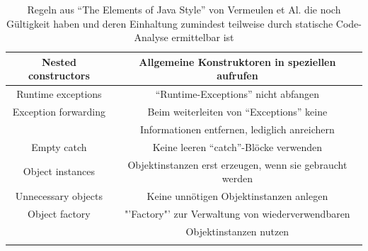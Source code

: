 \documentclass[da,ngerman]{stthesis}
\begin{document}
\begin{center}
\begin{longtabu}{|c|c|}
  						\hline
  						Nested constructors & Allgemeine Konstruktoren in speziellen aufrufen \\
  						\hline
  						Runtime exceptions & "`Runtime-Exceptions"' nicht abfangen \\
  						\hline
  						Exception forwarding & Beim weiterleiten von "`Exceptions"' keine \\ & Informationen entfernen, lediglich anreichern \\
  						\hline   
  						Empty catch & Keine leeren "`catch"'-Blöcke verwenden \\
  						\hline
  						Object instances & Objektinstanzen erst erzeugen, wenn sie gebraucht werden \\
  						\hline
  						Unnecessary objects & Keine unnötigen Objektinstanzen anlegen \\
  						\hline
  						Object factory & "'Factory"' zur Verwaltung von wiederverwendbaren \\ & Objektinstanzen nutzen \\
  						\hline
  						
  						\caption{Regeln aus "`The Elements of Java Style"' von Vermeulen et Al. die noch Gültigkeit haben und deren Einhaltung zumindest teilweise durch statische Code-Analyse ermittelbar ist \cite{ElementsOfJavaStyle}}
						\label{elementsrules}
  					\end{longtabu}   
  				\end{center}
\end{document}

